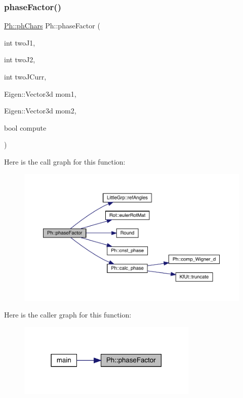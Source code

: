 \subsubsection{\texorpdfstring{phaseFactor()}{phaseFactor()}}
{\footnotesize\ttfamily \mbox{\hyperlink{structPh_1_1phChars}{Ph\+::ph\+Chars}} Ph\+::phase\+Factor (\begin{DoxyParamCaption}\item[{int}]{two\+J1,  }\item[{int}]{two\+J2,  }\item[{int}]{two\+J\+Curr,  }\item[{Eigen\+::\+Vector3d}]{mom1,  }\item[{Eigen\+::\+Vector3d}]{mom2,  }\item[{bool}]{compute }\end{DoxyParamCaption})}

Here is the call graph for this function\+:\nopagebreak
\begin{figure}[H]
\begin{center}
\leavevmode
\includegraphics[width=350pt]{d6/d3c/namespacePh_ad2fd8f885053b0833441c8388a9218b8_cgraph}
\end{center}
\end{figure}
Here is the caller graph for this function\+:\nopagebreak
\begin{figure}[H]
\begin{center}
\leavevmode
\includegraphics[width=243pt]{d6/d3c/namespacePh_ad2fd8f885053b0833441c8388a9218b8_icgraph}
\end{center}
\end{figure}
